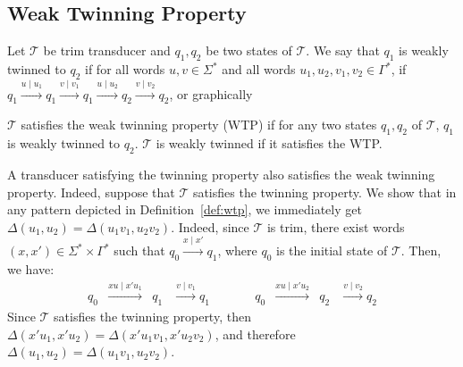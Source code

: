 \documentclass[envcountsame]{llncs}
\newcommand\trans[2]{\ensuremath{#1\mid #2}}
\newcommand\delay{\Delta}
\newcommand\tra{\mathcal{T}}
\begin{document}
\subsection{Weak Twinning Property}
\vspace{-1mm} 

\begin{definition}\label{def:wtp}
    Let $\mathcal{T}$ be trim transducer and $q_1,q_2$ be two
    states of $\mathcal{T}$. We say that $q_1$ is weakly twinned to
    $q_2$ if for all words
    $u,v\in \Sigma^*$ and all words $u_1,u_2,v_1,v_2\in \Gamma^*$, if $q_1\xrightarrow{u\mid u_1} q_1 \xrightarrow{v\mid v_1}
    q_1\xrightarrow{u\mid u_2} q_2 \xrightarrow{v\mid v_2} q_2$, or graphically
\begin{center}
\vspace{-1mm}
\end{center}
\vspace{-2mm}
\noindent $\mathcal{T}$ satisfies the weak twinning property (WTP) if for any
two states $q_1,q_2$ of $\mathcal{T}$, $q_1$ is weakly twinned to
$q_2$. $\mathcal{T}$ is weakly twinned if it satisfies the
WTP. 
\end{definition}


\begin{remark}\label{rm:TPvsWTP} 
A transducer satisfying the twinning property also satisfies the weak
twinning property. Indeed, suppose that $\tra$ satisfies the twinning
property. We show that in any pattern depicted in
Definition~\ref{def:wtp}, we immediately get
$\delay(u_1,u_2)=\delay(u_1v_1,u_2v_2)$. Indeed, since $\tra$ is trim, 
there exist words $(x,x')\in \Sigma^*\times \Gamma^*$ such
that $q_0\xrightarrow{x\mid x'} q_1$, where $q_0$ is the
initial state of $\tra$. Then, we have:
\vspace{-2mm}
$$
\begin{array}{lllllllll}
  q_0 & \xrightarrow{xu\mid x'u_1} & q_1 & \xrightarrow{v\mid
                                                v_1} q_1 & \qquad &
  q_0 & \xrightarrow{xu\mid x'u_2} & q_2 & \xrightarrow{v\mid v_2} q_2
\end{array}
$$
Since $\tra$ satisfies the twinning property, then 
$\delay(x'u_1,x'u_2) = \delay(x'u_1v_1,x'u_2v_2)$, and therefore
$\delay(u_1,u_2) = \delay(u_1v_1,u_2v_2)$. 
\end{remark}
\end{document}

